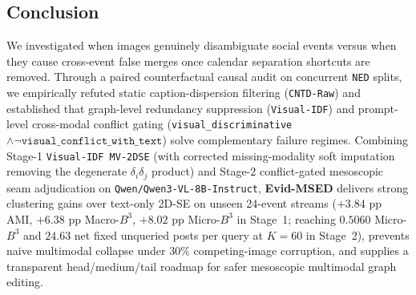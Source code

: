 \subsection{Conclusion}
We investigated when images genuinely disambiguate social events versus when they cause cross-event false merges once calendar separation shortcuts are removed. Through a paired counterfactual causal audit on concurrent \texttt{NED} splits, we empirically refuted static caption-dispersion filtering (\texttt{CNTD-Raw}) and established that graph-level redundancy suppression (\texttt{Visual-IDF}) and prompt-level cross-modal conflict gating (\texttt{visual\_discriminative} $\wedge \neg\texttt{visual\_conflict\_with\_text}$) solve complementary failure regimes. Combining Stage-1 \texttt{Visual-IDF MV-2DSE} (with corrected missing-modality soft imputation removing the degenerate $\delta_i \delta_j$ product) and Stage-2 conflict-gated mesoscopic seam adjudication on \texttt{Qwen/Qwen3-VL-8B-Instruct}, \textbf{Evid-MSED} delivers strong clustering gains over text-only 2D-SE on unseen 24-event streams ($+3.84\text{ pp}$ AMI, $+6.38\text{ pp}$ Macro-$B^3$, $+8.02\text{ pp}$ Micro-$B^3$ in Stage~1; reaching $0.5060$ Micro-$B^3$ and $24.63$ net fixed unqueried posts per query at $K=60$ in Stage~2), prevents naive multimodal collapse under $30\%$ competing-image corruption, and supplies a transparent head/medium/tail roadmap for safer mesoscopic multimodal graph editing.
